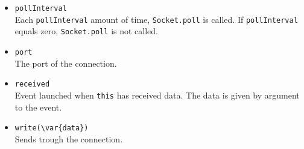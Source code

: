 \begin{itemize}
\item \lstinline|pollInterval|\\
  Each \lstinline|pollInterval| amount of time, \lstinline|Socket.poll|
  is called. If \lstinline|pollInterval| equals zero,
  \lstinline|Socket.poll| is not called.

\item \lstinline|port|\\
  The port of the connection.

\item \lstinline|received|\\
  Event launched when \lstinline|this| has received data. The data is
  given by argument to the event.

\item \lstinline|write(\var{data})|\\
  Sends  trough the connection.

\end{itemize}

